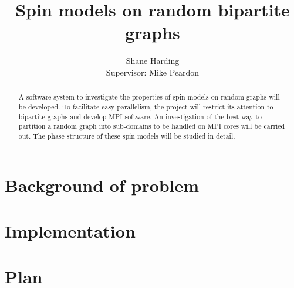 \documentclass{article}
\begin{document}
\title{Spin models on random bipartite graphs}
\author{Shane Harding \\ Supervisor: Mike Peardon}

\maketitle

\begin{abstract}
A software system to investigate the properties of spin models on random graphs will be developed. To facilitate easy parallelism, the project will restrict its attention to bipartite graphs and develop MPI software. An investigation of the best way to partition a random graph into sub-domains to be handled on MPI cores will be carried out. The phase structure of these spin models will be studied in detail.
\end{abstract}

\section{Background of problem}

\section{Implementation}

\section{Plan}
\end{document}
